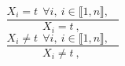 $$\frac{X_{i}=t~~\forall i,~i \in \llbracket1,n\rrbracket,~~~~}{X_{i}=t~,~}$$ $$\frac{X_{i} \neq t~~\forall i,~i \in \llbracket1,n\rrbracket,~~~~}{X_{i} \neq t~,~}$$ 